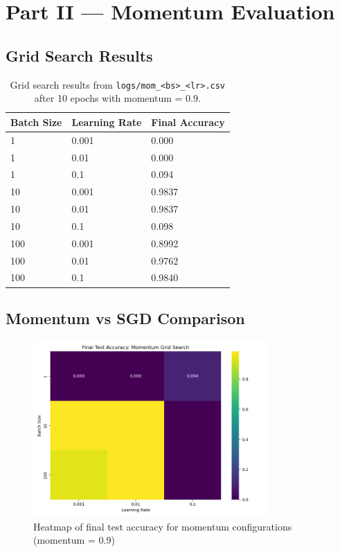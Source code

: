 \documentclass[11pt]{article}
\begin{document}
\section{Part II — Momentum Evaluation}

\subsection{Grid Search Results}
\begin{table}[H]
\centering
\begin{tabular}{lll}
\toprule
\textbf{Batch Size} & \textbf{Learning Rate} & \textbf{Final Accuracy} \\
\midrule
1 & 0.001 & 0.000 \\
1 & 0.01  & 0.000 \\
1 & 0.1   & 0.094 \\
10 & 0.001 & 0.9837 \\
10 & 0.01  & 0.9837 \\
10 & 0.1   & 0.098 \\
100 & 0.001 & 0.8992 \\
100 & 0.01  & 0.9762 \\
100 & 0.1   & 0.9840 \\
\bottomrule
\end{tabular}
\caption{Grid search results from \texttt{logs/mom\_\textless bs\textgreater\_\textless lr\textgreater.csv} after 10 epochs with momentum = 0.9.}
\end{table}

\subsection{Momentum vs SGD Comparison}
\begin{figure}[H]
\centering
\includegraphics[width=0.8\textwidth]{../figures/compare_partII.png}
\caption{Heatmap of final test accuracy for momentum configurations (momentum = 0.9)}
\end{figure}
\end{document}

